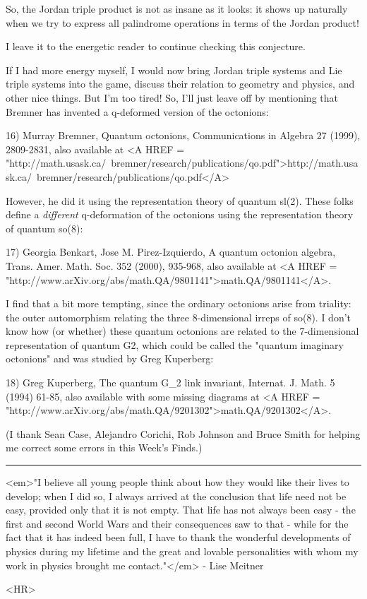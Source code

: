 So, the Jordan triple product is not as insane as it looks: it 
shows up naturally when we try to express all palindrome operations 
in terms of the Jordan product!

I leave it to the energetic reader to continue checking this conjecture.

If I had more energy myself, I would now bring Jordan triple systems and
Lie triple systems into the game, discuss their relation to geometry and
physics, and other nice things.  But I'm too tired!  So, I'll just leave
off by mentioning that Bremner has invented a q-deformed version of the
octonions:

16) Murray Bremner, Quantum octonions, Communications in Algebra 
27 (1999), 2809-2831, also available at 
<A HREF = "http://math.usask.ca/~bremner/research/publications/qo.pdf">http://math.usask.ca/~bremner/research/publications/qo.pdf</A>

However, he did it using the representation theory of quantum sl(2).
These folks define a \emph{different} q-deformation of the octonions using
the representation theory of quantum so(8):

17) Georgia Benkart, Jose M. Pirez-Izquierdo, A quantum octonion 
algebra, Trans. Amer. Math. Soc. 352 (2000), 935-968, also available at 
<A HREF = "http://www.arXiv.org/abs/math.QA/9801141">math.QA/9801141</A>.

I find that a bit more tempting, since the ordinary octonions arise from
triality: the outer automorphism relating the three 8-dimensional irreps
of so(8).  I don't know how (or whether) these quantum octonions are
related to the 7-dimensional representation of quantum G2, which could
be called the "quantum imaginary octonions" and was studied by Greg
Kuperberg:

18) Greg Kuperberg, The quantum G_{2} link invariant, Internat. 
J. Math. 5 (1994) 61-85, also available with some missing diagrams at
<A HREF = "http://www.arXiv.org/abs/math.QA/9201302">math.QA/9201302</A>.

(I thank Sean Case, Alejandro Corichi, Rob Johnson and Bruce Smith
for helping me correct some errors in this Week's Finds.)  
\par\noindent\rule{\textwidth}{0.4pt}
<em>"I believe all young people think about how they would like their
lives to develop; when I did so, I always arrived at the conclusion
that life need not be easy, provided only that it is not empty. 
That life has not always been easy - the first and second World
Wars and their consequences saw to that - while for the fact that it has
indeed been full, I have to thank the wonderful developments of
physics during my lifetime and the great and lovable personalities
with whom my work in physics brought me contact."</em> - Lise Meitner


<HR>



